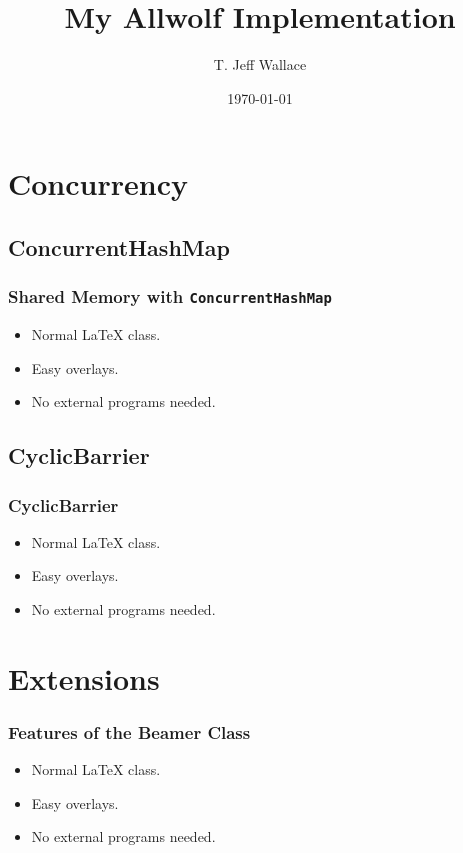 \documentclass{beamer}
\title{My Allwolf Implementation}
\author{T. Jeff Wallace}
\institute{McGill}
\date{\today}
\begin{document}
\frame{\titlepage}

\section[Outline]{}
\frame{\tableofcontents}

\section{Concurrency}

\subsection{ConcurrentHashMap}
\begin{frame}
  \frametitle{Shared Memory with {\tt ConcurrentHashMap}}

  \begin{itemize}
  \item Normal LaTeX class.
  \item Easy overlays.
  \item No external programs needed.      
  \end{itemize}
\end{frame}

\subsection{CyclicBarrier}
\begin{frame}
  \frametitle{CyclicBarrier}

  \begin{itemize}
  \item Normal LaTeX class.
  \item Easy overlays.
  \item No external programs needed.      
  \end{itemize}
\end{frame}

\section{Extensions}
\begin{frame}
  \frametitle{Features of the Beamer Class}

  \begin{itemize}
  \item Normal LaTeX class.
  \item Easy overlays.
  \item No external programs needed.      
  \end{itemize}
\end{frame}
\end{document}

